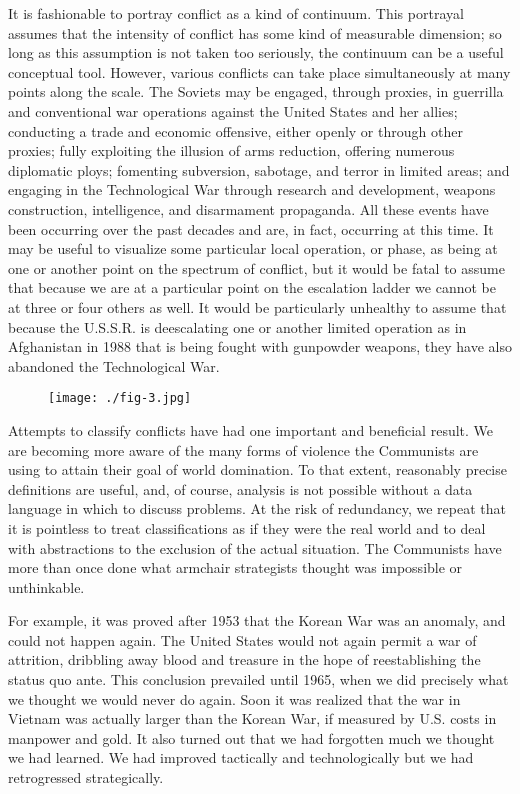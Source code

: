 It is fashionable to portray conflict as a kind of continuum. This portrayal assumes that the intensity of conflict has some kind of measurable dimension; so long as this assumption is not taken too seriously, the continuum can be a useful conceptual tool. However, various conflicts can take place simultaneously at many points along the scale. The Soviets may be engaged, through proxies, in guerrilla and conventional war operations against the United States and her allies; conducting a trade and economic offensive, either openly or through other proxies; fully exploiting the illusion of arms reduction, offering numerous diplomatic ploys; fomenting subversion, sabotage, and terror in limited areas; and engaging in the Technological War through research and development, weapons construction, intelligence, and disarmament propaganda. All these events have been occurring over the past decades and are, in fact, occurring at this time. It may be useful to visualize some particular local operation, or phase, as being at one or another point on the spectrum of conflict, but it would be fatal to assume that because we are at a particular point on the escalation ladder we cannot be at three or four others as well. It would be particularly unhealthy to assume that because the U.S.S.R. is deescalating one or another limited operation as in Afghanistan in 1988 that is being fought with gunpowder weapons, they have also abandoned the Technological War.

\begin{figure}
    \texttt{[image: ./fig-3.jpg]}
\end{figure}

Attempts to classify conflicts have had one important and beneficial result. We are becoming more aware of the many forms of violence the Communists are using to attain their goal of world domination. To that extent, reasonably precise definitions are useful, and, of course, analysis is not possible without a data language in which to discuss problems. At the risk of redundancy, we repeat that it is pointless to treat classifications as if they were the real world and to deal with abstractions to the exclusion of the actual situation. The Communists have more than once done what armchair strategists thought was impossible or unthinkable.

For example, it was proved after 1953 that the Korean War was an anomaly, and could not happen again. The United States would not again permit a war of attrition, dribbling away blood and treasure in the hope of reestablishing the status quo ante. This conclusion prevailed until 1965, when we did precisely what we thought we would never do again. Soon it was realized that the war in Vietnam was actually larger than the Korean War, if measured by U.S. costs in manpower and gold. It also turned out that we had forgotten much we thought we had learned. We had improved tactically and technologically but we had retrogressed strategically.

